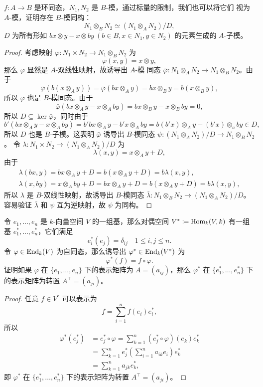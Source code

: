 \begin{problem}
  $f:A\to B$ 是环同态，$N_1,N_2$ 是 $B$-模，通过标量的限制，我们也可以将它们
  视为 $A$-模，证明存在 $B$-模同构：
  \[
    N_1\otimes_BN_2\simeq (N_1\otimes_AN_2)/D,  
  \]
  $D$ 为所有形如 $bx\otimes y-x\otimes by\ (b\in B,x\in N_1,y\in N_2)$ 的元素生成的
  $A$-子模。
\end{problem}
\begin{proof}
  考虑映射 $\varphi:N_1\times N_2\to N_1\otimes_BN_2$ 为
  \[
    \varphi(x,y)=x\otimes y,  
  \]
  那么 $\varphi$ 显然是 $A$-双线性映射，故诱导出 $A$-模
  同态 $\bar\varphi:N_1\otimes_AN_2\to N_1\otimes_BN_2$。由于
  \[
    \bar\varphi(b(x\otimes_A y))=  \bar\varphi(bx\otimes_Ay)=bx\otimes_By=
    b(x\otimes_By),
  \]
  所以 $\bar\varphi$ 也是 $B$-模同态。由于
  \[
    \bar\varphi(bx\otimes_Ay-x\otimes_Aby)
    =bx\otimes_By-x\otimes_Bby=0,  
  \]
  所以 $D\subseteq\ker\bar\varphi$，同时由于
  \[
    b'(bx\otimes_Ay-x\otimes_Aby)=b'bx\otimes_Ay-b'x\otimes_Aby
    =b(b'x)\otimes_Ay-(b'x)\otimes_aby\in D,  
  \]
  所以 $D$ 也是 $B$-子模。这表明 $\bar\varphi$ 诱导出 $B$-模同态
  $\psi:(N_1\otimes_AN_2)/D\to N_1\otimes_BN_2$。
  令 $\lambda:N_1\times N_2\to (N_1\otimes_AN_2)/D$ 为
  \[
      \lambda(x,y)=x\otimes_Ay+D,
  \]
  由于
  \begin{gather*}
    \lambda(bx,y)=bx\otimes_Ay+D=b(x\otimes_Ay+D)=b\lambda(x,y),\\
    \lambda(x,by)=x\otimes_Aby+D=bx\otimes_Ay+D=b(x\otimes_Ay+D)=b\lambda(x,y),
  \end{gather*}
  所以 $\lambda$ 是 $B$-双线性映射，故诱导出 $B$-模同态
  $\bar\lambda:N_1\otimes_BN_2\to (N_1\otimes_AN_2)/D$。
  容易验证 $\bar\lambda$ 和 $\psi$ 互为逆映射，故 $\psi$ 为同构。
\end{proof}

\begin{problem}
  令 $e_1,\dots,e_n$ 是 $k$-向量空间 $V$ 的一组基，那么对偶空间 $V^*\coloneqq \operatorname{Hom}_k(V,k)$ 有一组基
  $e_1^*,\dots,e_n^*$，它们满足
  \[
    e_i^*(e_j)  =\delta_{ij}\quad 1\leq i,j\leq n.
  \]
  令 $\varphi\in\operatorname{End}_k(V)$ 为自同态，那么诱导出 $\varphi^*\in\operatorname{End}_k(V^*)$ 为
  \[
    \varphi^*(f)=f\circ \varphi.  
  \]
  证明如果 $\varphi$ 在 $\{e_1,\dots,e_n\}$ 下的表示矩阵为 $A=(a_{ij})$，那么
  $\varphi^*$ 在 $\{e_1^*,\dots,e_n^*\}$ 下的表示矩阵为转置 $A^\top=(a_{ji})$。
\end{problem}
\begin{proof}
  任意 $f\in V^*$ 可以表示为
  \[
    f=\sum_{i=1}^n f(e_i)e_i^*,  
  \]
  所以
  \begin{align*}
    \varphi^*(e_j^*)&=e_j^*\circ\varphi=\sum_{k=1}^n (e_j^*\circ\varphi)(e_k)e_k^*\\
    &=\sum_{k=1}^ne_j^*\left(\sum_{i=1}^n a_{ik}e_i\right)e_k^*\\
    &=\sum_{k=1}^n a_{jk}e_k^*,
  \end{align*}
  即 $\varphi^*$ 在 $\{e_1^*,\dots,e_n^*\}$ 下的表示矩阵为转置 $A^\top=(a_{ji})$。
\end{proof}

